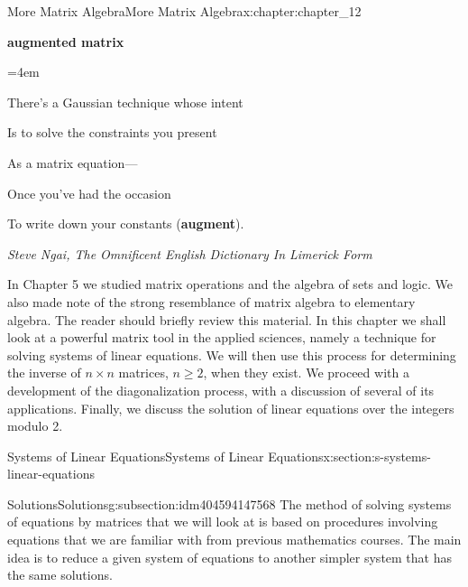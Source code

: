 \documentclass[twoside,10pt,]{book}
\newcommand{\terminology}[1]{\textbf{#1}}
\numberwithin{equation}{section}
\newenvironment{poem}{\setlength{\parindent}{0em}}{}
\newcommand{\poemTitle}[1]{\begin{center}\large\textbf{#1}\end{center}}
\newenvironment{stanza}{\vspace{0.25 em}\hangindent=4em}{\vspace{1 em}}
\newcommand{\poemauthorleft}[1]{\vspace{-1em}\begin{flushleft}\textit{#1}\end{flushleft}}
\newcommand{\poemlineleft}[1]{{\raggedright{#1}\par}\vspace{-\parskip}}
\begin{document}
%
%
\typeout{************************************************}
\typeout{************************************************}
%
\begin{chapterptx}{More Matrix Algebra}{}{More Matrix Algebra}{}{}{x:chapter:chapter_12}
\begin{introduction}{}%
\begin{poem}%
\poemTitle{augmented matrix}
\begin{stanza}
\poemlineleft{There's a Gaussian technique whose intent}
\poemlineleft{Is to solve the constraints you present}
\poemlineleft{As a matrix equation—}
\poemlineleft{Once you've had the occasion}
\poemlineleft{To write down your constants (\terminology{augment}).}
\end{stanza}
\poemauthorleft{Steve Ngai, The Omnificent English Dictionary In Limerick Form}
\end{poem}
In Chapter 5 we studied matrix operations and the algebra of sets and logic. We also made note of the strong resemblance of matrix algebra to elementary algebra. The reader should briefly review this material. In this chapter we shall look at a powerful matrix tool in the applied sciences, namely a technique for solving systems of linear equations. We will then use this process for determining the inverse of \(n\times n\) matrices, \(n \geq 2\), when they exist. We proceed with a development of the diagonalization process, with a discussion of several of its applications. Finally, we discuss the solution of linear equations over the integers modulo 2.%
\end{introduction}%
%
%
\typeout{************************************************}
\typeout{************************************************}
%
\begin{sectionptx}{Systems of Linear Equations}{}{Systems of Linear Equations}{}{}{x:section:s-systems-linear-equations}
%
%
%
\typeout{************************************************}
\typeout{************************************************}
%
\begin{subsectionptx}{Solutions}{}{Solutions}{}{}{g:subsection:idm404594147568}
The method of solving systems of equations by matrices that we will look at is based on procedures involving equations that we are familiar with from previous mathematics courses. The main idea is to reduce a given system of equations to another simpler system that has the same solutions.%

\end{subsectionptx}
\end{sectionptx}
\end{chapterptx}
\end{document}
